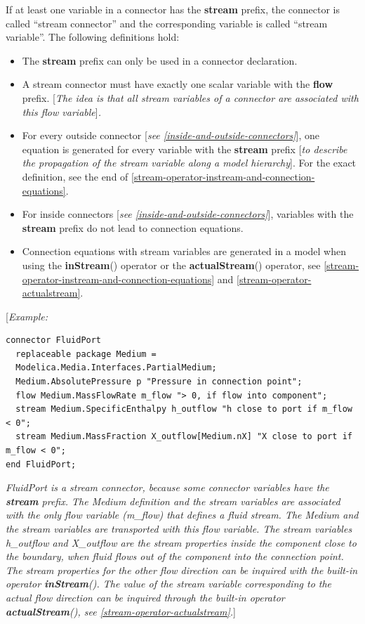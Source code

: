 \documentclass[10pt,a4paper]{report}
\begin{document}
If at least one variable in a connector has the \textbf{stream} prefix,
the connector is called ``stream connector'' and the corresponding
variable is called ``stream variable''. The following definitions hold:

\begin{itemize}
\item
  The \textbf{stream} prefix can only be used in a connector
  declaration.
\item
  A stream connector must have exactly one scalar variable with the
  \textbf{flow} prefix. {[}\emph{The idea is that all stream variables
  of a connector are associated with this flow variable}{]}\emph{.}
\item
  For every outside connector {[}\emph{see \ref{inside-and-outside-connectors}}{]}, one
  equation is generated for every variable with the \textbf{stream}
  prefix {[}\emph{to describe the propagation of the stream variable
  along a model hierarchy}{]}. For the exact definition, see the end of
  \ref{stream-operator-instream-and-connection-equations}.
\item
  For inside connectors {[}\emph{see \ref{inside-and-outside-connectors}}{]}, variables
  with the \textbf{stream} prefix do not lead to connection equations.
\item
  Connection equations with stream variables are generated in a model
  when using the \textbf{inStream}() operator or the
  \textbf{actualStream}() operator, see \ref{stream-operator-instream-and-connection-equations}
  and \ref{stream-operator-actualstream}.
\end{itemize}

{[}\emph{Example:}

\begin{lstlisting}[language=modelica]
connector FluidPort
  replaceable package Medium =
  Modelica.Media.Interfaces.PartialMedium;
  Medium.AbsolutePressure p "Pressure in connection point";
  flow Medium.MassFlowRate m_flow "> 0, if flow into component";
  stream Medium.SpecificEnthalpy h_outflow "h close to port if m_flow < 0";
  stream Medium.MassFraction X_outflow[Medium.nX] "X close to port if m_flow < 0";
end FluidPort;
\end{lstlisting}
\emph{FluidPort is a stream connector, because some connector variables
have the \textbf{stream} prefix. The Medium definition and the stream
variables are associated with the only flow variable (m\_flow) that
defines a fluid stream. The Medium and the stream variables are
transported with this flow variable. The stream variables h\_outflow and
X\_outflow are the stream properties inside the component close to the
boundary, when fluid flows out of the component into the connection
point. The stream properties for the other flow direction can be
inquired with the built-in operator \textbf{inStream}(). The value of
the stream variable corresponding to the actual flow direction can be
inquired through the built-in operator \textbf{actualStream}(), see
\ref{stream-operator-actualstream}.}{]}
\end{document}

